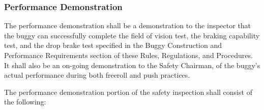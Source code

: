 \subsubsection{Performance Demonstration}

	The performance demonstration shall be a demonstration to the inspector that
	the buggy can successfully complete the field of vision test, the braking
	capability test, and the drop brake test specified in the Buggy Construction
	and Performance Requirements section of these Rules, Regulations, and
	Procedures. It shall also be an on-going demonstration to the Safety Chairman,
	of the buggy's actual performance during both freeroll and push practices.
	\newline

	\noindent The performance demonstration portion of the safety inspection shall consist of
	the following:

